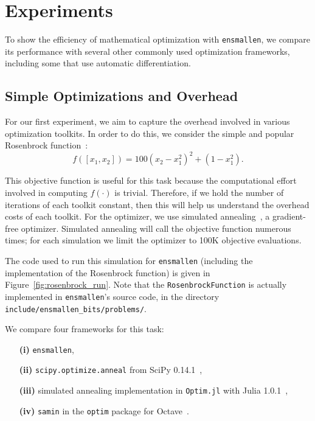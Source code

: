 \section{Experiments}
\label{sec:experiments}

To show the efficiency of mathematical optimization with {\tt ensmallen}, we
compare its performance with several other commonly used optimization
frameworks, including some that use automatic differentiation.

\subsection{Simple Optimizations and Overhead}

For our first experiment, we aim to capture the overhead involved in various
optimization toolkits.  In order to do this, we consider the simple and popular
Rosenbrock function~\cite{Rosenbrock1960}:
%
\begin{equation}
f([x_1, x_2]) = 100 (x_2 - x_1^2)^2 + (1 - x_1^2).
\end{equation}

This objective function is useful for this task because the computational effort
involved in computing $f(\cdot)$ is trivial.  Therefore, if we hold the number
of iterations of each toolkit constant, then this will help us understand the
overhead costs of each toolkit.  For the optimizer, we use simulated
annealing~\cite{kirkpatrick1983optimization}, a gradient-free optimizer.
Simulated annealing will call the objective function numerous times; for each
simulation we limit the optimizer to 100K objective evaluations.

The code used to run this simulation for {\tt ensmallen} (including the
implementation of the Rosenbrock function) is given in
Figure~\ref{fig:rosenbrock_run}.  Note that the {\tt RosenbrockFunction} is
actually implemented in {\tt ensmallen}'s source code, in the directory {\tt
include/ensmallen\_bits/problems/}.


We compare four frameworks for this task:
%
\begin{itemize}
\itemsep=-1ex
  \item[{\bf (i)}] {\tt ensmallen},
  \item[{\bf (ii)}] {\tt scipy.optimize.anneal} from SciPy 0.14.1~\cite{jones2014scipy},
  \item[{\bf (iii)}] simulated annealing implementation in {\tt Optim.jl} with Julia 1.0.1~\cite{mogensen2018optim},
  \item[{\bf (iv)}] {\tt samin} in the {\tt optim} package for Octave~\cite{octave}.
\end{itemize}

